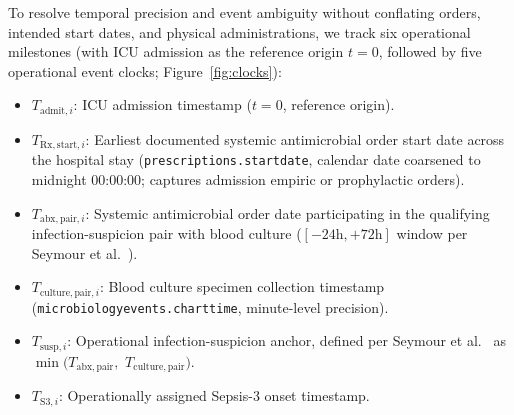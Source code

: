 \documentclass[12pt,a4paper]{article}
\begin{document}
To resolve temporal precision and event ambiguity without conflating orders, intended start dates, and physical administrations, we track six operational milestones (with ICU admission as the reference origin $t=0$, followed by five operational event clocks; Figure~\ref{fig:clocks}):
\begin{itemize}
    \setlength{\itemsep}{0.5pt}
    \setlength{\parsep}{0pt}
    \setlength{\parskip}{0pt}
    \item $T_{\text{admit}, i}$: ICU admission timestamp ($t=0$, reference origin).
    \item $T_{\mathrm{Rx,start}, i}$: Earliest documented systemic antimicrobial order start date across the hospital stay (\texttt{prescriptions.\allowbreak startdate}, calendar date coarsened to midnight 00:00:00; captures admission empiric or prophylactic orders).
    \item $T_{\mathrm{abx,pair}, i}$: Systemic antimicrobial order date participating in the qualifying infection-suspicion pair with blood culture ($[-24\text{h}, +72\text{h}]$ window per Seymour et al.~\cite{seymour2016assessment}).
    \item $T_{\mathrm{culture,pair}, i}$: Blood culture specimen collection timestamp (\texttt{microbiologyevents.charttime}, minute-level precision).
    \item $T_{\mathrm{susp}, i}$: Operational infection-suspicion anchor, defined per Seymour et al.~\cite{seymour2016assessment} as $\min(T_{\mathrm{abx,pair}},$ $T_{\mathrm{culture,pair}})$.
    \item $T_{\text{S3}, i}$: Operationally assigned Sepsis-3 onset timestamp.
\end{itemize}
\end{document}
